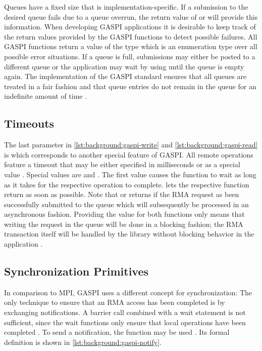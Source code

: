 Queues have a fixed size that is implementation-specific. If a submission to the desired queue fails due to a queue overrun, the return value of  or  will provide this information. When developing \ac{GASPI} applications it is desirable to keep track of the return values provided by the \ac{GASPI} functions to detect possible failures. All \ac{GASPI} functions return a value of the type  which is an enumeration type over all possible error situations. If a queue is full, submissions may either be posted to a different queue or the application may wait by using   until the queue is empty again. The implementation of the \ac{GASPI} standard ensures that all queues are treated in a fair fashion and that queue entries do not remain in the queue for an indefinite amount of time \cite[ch.~8.1]{gaspi-std}.

\subsection{Timeouts}

The last parameter in \autoref{lst:background:gaspi-write} and \autoref{lst:background:gaspi-read} is  which corresponds to another special feature of \ac{GASPI}. All remote operations feature a timeout that may be either specified in milliseconds or as a special value \cite[ch.~3.9]{gaspi-std}. Special values are  and . The first value causes the function to wait as long as it takes for the respective operation to complete.  lets the respective function return as soon as possible. Note that   or  returns if the \ac{RMA} request as been successfully submitted to the queue which will subsequently be processed in an asynchronous fashion. Providing the  value for both functions only means that writing the request in the queue will be done in a blocking fashion; the \ac{RMA} transaction itself will be handled by the library without blocking behavior in the application \cite[p.~60\,f.]{gaspi-std}.

\subsection{Synchronization Primitives}

In comparison to \ac{MPI}, \ac{GASPI} uses a different concept for synchronization: The only technique to ensure that an \ac{RMA} access has been completed is by exchanging notifications. A barrier call combined with a wait statement is not sufficient, since the wait functions only ensure that local operations have been completed \cite[p.~20]{gaspi-tut}. To send a notification, the function  may be used \cite[ch.~8.3.2]{gaspi-std}. Its formal definition is shown in \autoref{lst:background:gaspi-notify}.

